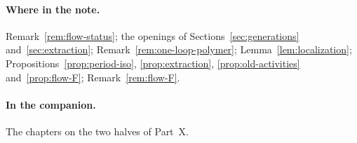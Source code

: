 \paragraph{Where in the note.} Remark~\ref{rem:flow-status}; the openings of Sections~\ref{sec:generations} and~\ref{sec:extraction}; Remark~\ref{rem:one-loop-polymer}; Lemma~\ref{lem:localization}; Propositions~\ref{prop:period-iso}, \ref{prop:extraction}, \ref{prop:old-activities} and~\ref{prop:flow-F}; Remark~\ref{rem:flow-F}.

\paragraph{In the companion.} The chapters on the two halves of Part~X.

